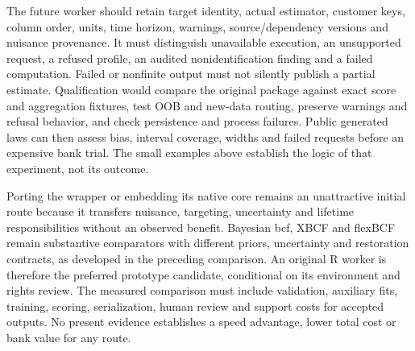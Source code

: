 The future worker should retain target identity, actual estimator, customer keys, column order, units, time horizon, warnings, source/dependency versions and nuisance provenance. It must distinguish unavailable execution, an unsupported request, a refused profile, an audited nonidentification finding and a failed computation. Failed or nonfinite output must not silently publish a partial estimate. Qualification would compare the original package against exact score and aggregation fixtures, test OOB and new-data routing, preserve warnings and refusal behavior, and check persistence and process failures. Public generated laws can then assess bias, interval coverage, widths and failed requests before an expensive bank trial. The small examples above establish the logic of that experiment, not its outcome.

Porting the wrapper or embedding its native core remains an unattractive initial route because it transfers nuisance, targeting, uncertainty and lifetime responsibilities without an observed benefit. Bayesian bcf, XBCF and flexBCF remain substantive comparators with different priors, uncertainty and restoration contracts, as developed in the preceding comparison. An original R worker is therefore the preferred prototype candidate, conditional on its environment and rights review. The measured comparison must include validation, auxiliary fits, training, scoring, serialization, human review and support costs for accepted outputs. No present evidence establishes a speed advantage, lower total cost or bank value for any route.\citep{exec21_grf_reuse,exec21_cxx_bcf,exec21_cxx_xbcf,exec21_cxx_flexbcf}

